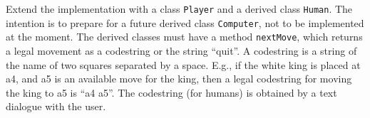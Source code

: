 Extend the implementation with a class \lstinline{Player} and a derived class \lstinline{Human}. The intention is to prepare for a future derived class \lstinline{Computer}, not to be implemented at the moment. The derived classes must have a method \lstinline{nextMove}, which returns a legal movement as a codestring or the string ``quit''.  A codestring is a string of the name of two squares separated by a space. E.g., if the white king is placed at a4, and a5 is an available move for the king, then a legal codestring for moving the king to a5 is ``a4 a5''. The codestring (for humans) is obtained by a text dialogue with the user.
